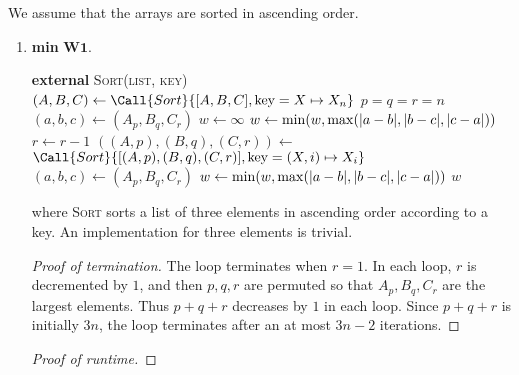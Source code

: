 \documentclass[12pt]{article}
\begin{document}
\begin{problem}
    
\end{problem}
\begin{solution} \leavevmode
    We assume that the arrays are sorted in ascending order.
    \begin{enumerate}[wide]
        \item \textbf{min} $\bm{W1}$.
            \begin{algorithm}[H]
                \caption{Minimum of $W_1$}
                \begin{algorithmic}[1]
                    \State \textbf{external} \textsc{Sort(list, key)}
                        \State $(A, B, C) \gets \Call{Sort}{[A, B, C], \text{key}=X \mapsto X_{n}}$
                        \State $p = q = r = n$
                        \State $(a, b, c) \gets (A_{p}, B_{q}, C_{r})$
                        \State $w \gets \infty$
                            \State $w \gets \min(w, \max(\abs{a - b}, \abs{b - c}, \abs{c - a}))$
                            \State $r \gets r - 1$
                            \State $((A, p), (B, q), (C, r)) \gets$
                            \Statex \quad $\Call{Sort}{[(A, p), (B, q), (C, r)], \text{key}=(X, i) \mapsto X_{i}}$
                            \State $(a, b, c) \gets (A_{p}, B_{q}, C_{r})$
                        \EndWhile
                        \State $w \gets \min(w, \max(\abs{a - b}, \abs{b - c}, \abs{c - a}))$
                        \State \Return $w$
                    \EndFunction
                \end{algorithmic}
            \end{algorithm}
            where \textsc{Sort} sorts a list of three elements in ascending
            order according to a key.
            An implementation for three elements is trivial.
            \begin{proof}[Proof of termination]
                The loop terminates when $r = 1$.
                In each loop, $r$ is decremented by $1$, and then $p, q, r$ are
                permuted so that $A_{p}, B_{q}, C_{r}$ are the largest elements.
                Thus $p + q + r$ decreases by $1$ in each loop.
                Since $p + q + r$ is initially $3n$, the loop terminates after
                an at most $3n - 2$ iterations.
            \end{proof}
            \begin{proof}[Proof of runtime]

\end{proof}
\end{enumerate}
\end{solution}
\end{document}
